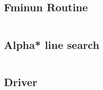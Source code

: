 \documentclass{article}
\begin{document}
\subsection{Fminun Routine}
\inputminted[xleftmargin=10pt,linenos]{matlab}{fminun.m}
\subsection{Alpha* line search}
\inputminted[xleftmargin=10pt, linenos]{matlab}{aPrime.m}
\subsection{Driver}
\inputminted[xleftmargin=10pt,linenos]{matlab}{fminunDriv.m}


\end{document}
